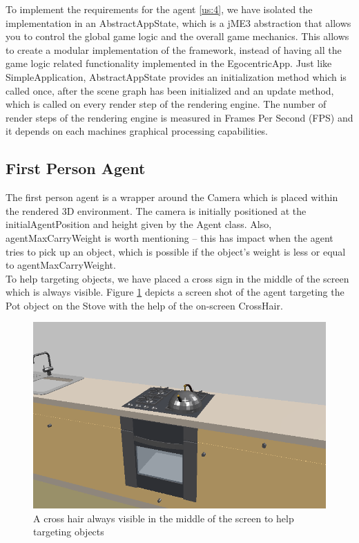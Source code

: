 To implement the requirements for the agent \ref{us:4}, we have isolated the implementation in an AbstractAppState, which is a jME3 abstraction that allows you to control the global game logic and the overall game mechanics. This allows to create a modular implementation of the framework, instead of having all the game logic related functionality implemented in the EgocentricApp. Just like SimpleApplication, AbstractAppState provides an initialization method which is called once, after the scene graph has been initialized and an update method, which is called on every render step of the rendering engine. The number of render steps of the rendering engine is measured in Frames Per Second (FPS) and it depends on each machines graphical processing capabilities.\\

\subsection{First Person Agent} %
\label{subsec:impl_the_first_agent}
The first person agent is a wrapper around the Camera which is placed within the rendered 3D environment. The camera is initially positioned at the initialAgentPosition and height given by the Agent class. Also, agentMaxCarryWeight is worth mentioning -- this has impact when the agent tries to pick up an object, which is possible if the object's weight is less or equal to agentMaxCarryWeight.\\

To help targeting objects, we have placed a cross sign in the middle of the screen which is always visible. Figure \ref{fig:impl_crosshair} depicts a screen shot of the agent targeting the Pot object on the Stove with the help of the on-screen CrossHair.
\begin{figure}[H]
	\centering
	\includegraphics[width=0.8\linewidth]{gfx/Chapter4/aiming}
	\caption{A cross hair always visible in the middle of the screen to help targeting objects}
	\label{fig:impl_crosshair}
\end{figure}

